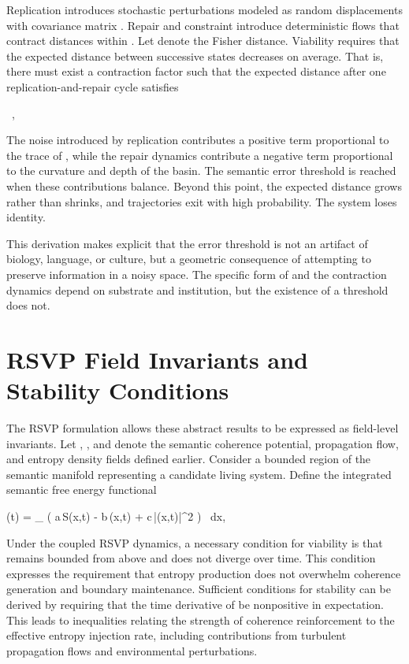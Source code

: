 \documentclass[11pt,oneside]{article}
\begin{document}
Replication introduces stochastic perturbations modeled as random displacements  with covariance matrix . Repair and constraint introduce deterministic flows that contract distances within . Let  denote the Fisher distance. Viability requires that the expected distance between successive states decreases on average. That is, there must exist a contraction factor  such that the expected distance after one replication-and-repair cycle satisfies

 \le \lambda \, ,

The noise introduced by replication contributes a positive term proportional to the trace of , while the repair dynamics contribute a negative term proportional to the curvature and depth of the basin. The semantic error threshold is reached when these contributions balance. Beyond this point, the expected distance grows rather than shrinks, and trajectories exit  with high probability. The system loses identity.

This derivation makes explicit that the error threshold is not an artifact of biology, language, or culture, but a geometric consequence of attempting to preserve information in a noisy space. The specific form of  and the contraction dynamics depend on substrate and institution, but the existence of a threshold does not.

\section{RSVP Field Invariants and Stability Conditions}

The RSVP formulation allows these abstract results to be expressed as field-level invariants. Let , , and  denote the semantic coherence potential, propagation flow, and entropy density fields defined earlier. Consider a bounded region  of the semantic manifold representing a candidate living system. Define the integrated semantic free energy functional

(t) = \int_{\Omega} \left( a\,S(x,t) - b\,\Phi(x,t) + c\,|\nabla \Phi(x,t)|^2 \right) \, dx,

Under the coupled RSVP dynamics, a necessary condition for viability is that  remains bounded from above and does not diverge over time. This condition expresses the requirement that entropy production does not overwhelm coherence generation and boundary maintenance. Sufficient conditions for stability can be derived by requiring that the time derivative of  be nonpositive in expectation. This leads to inequalities relating the strength of coherence reinforcement to the effective entropy injection rate, including contributions from turbulent propagation flows and environmental perturbations.
\end{document}
